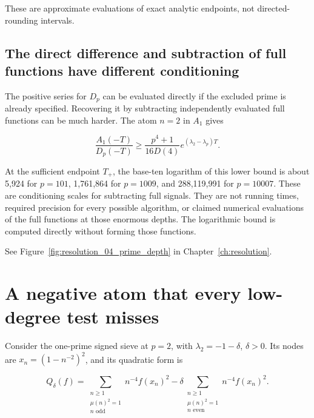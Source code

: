 These are approximate evaluations of exact analytic endpoints, not
directed-rounding intervals.

\hypertarget{v11-resolution_full-the-direct-difference-and-subtraction-of-full-functions-have-different-conditioning}{%
\subsection{The direct difference and subtraction of full functions
have different
conditioning}\label{v11-resolution_full-the-direct-difference-and-subtraction-of-full-functions-have-different-conditioning}}

The positive series for \(D_p\) can be evaluated directly if the
excluded prime is already specified. Recovering it by subtracting
independently evaluated full functions can be much harder. The atom
\(n=2\) in \(A_1\) gives

\[
\boxed{\frac{A_1(-T)}{D_p(-T)}
\ge\frac{p^4+1}{16D(4)}e^{(\lambda_2-\lambda_p)T}.}
\tag{RA-8}
\]

At the sufficient endpoint \(T_+\), the base-ten logarithm of this lower
bound is about 5,924 for \(p=101\), 1,761,864 for \(p=1009\), and
288,119,991 for \(p=10007\). These are conditioning scales for
subtracting full signals. They are not running times, required precision
for every possible algorithm, or claimed numerical evaluations of the
full functions at those enormous depths. The logarithmic bound is
computed directly without forming those functions.

See Figure~\ref{fig:resolution_04_prime_depth} in Chapter~\ref{ch:resolution}.

\hypertarget{v11-resolution_full-a-negative-atom-that-every-low-degree-test-misses}{%
\section{A negative atom that every low-degree test
misses}\label{v11-resolution_full-a-negative-atom-that-every-low-degree-test-misses}}

Consider the one-prime signed sieve at \(p=2\), with
\(\lambda_2=-1-\delta\), \(\delta>0\). Its nodes are
\(x_n=(1-n^{-2})^2\), and its quadratic form is

\[
Q_\delta(f)=\sum_{\substack{n\ge1\\\mu(n)^2=1\\n\text{ odd}}}n^{-4}f(x_n)^2
-\delta\sum_{\substack{n\ge1\\\mu(n)^2=1\\n\text{ even}}}n^{-4}f(x_n)^2.
\]

